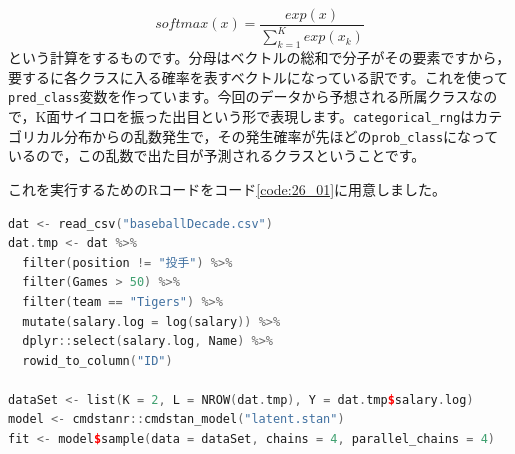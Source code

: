 \documentclass{ltjsbook}
\begin{document}
\begin{description}
	      \[ softmax(x) = \frac{exp(x)}{\sum_{k=1}^K exp(x_k)}\]
	      という計算をするものです。分母はベクトルの総和で分子がその要素ですから，要するに各クラスに入る確率を表すベクトルになっている訳です。これを使って\verb|pred_class|変数を作っています。今回のデータから予想される所属クラスなので，K面サイコロを振った出目という形で表現します。\verb|categorical_rng|はカテゴリカル分布からの乱数発生で，その発生確率が先ほどの\verb|prob_class|になっているので，この乱数で出た目が予測されるクラスということです。
\end{description}
これを実行するためのRコードをコード\ref{code:26_01}に用意しました。
\begin{lstlisting}[language=c++,label={code:26_01},caption={混合分布モデルのコード}]
dat <- read_csv("baseballDecade.csv")
dat.tmp <- dat %>%
  filter(position != "投手") %>%
  filter(Games > 50) %>%
  filter(team == "Tigers") %>%
  mutate(salary.log = log(salary)) %>%
  dplyr::select(salary.log, Name) %>%
  rowid_to_column("ID")

dataSet <- list(K = 2, L = NROW(dat.tmp), Y = dat.tmp$salary.log)
model <- cmdstanr::cmdstan_model("latent.stan")
fit <- model$sample(data = dataSet, chains = 4, parallel_chains = 4)
\end{lstlisting}
\end{document}
